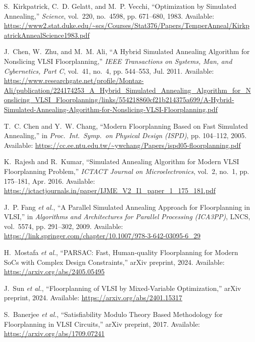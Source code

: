 \documentclass[9pt,a4paper,twoside]{rho-class/rho}
\begin{document}
\begin{thebibliography}{99}

S.~Kirkpatrick, C.~D. Gelatt, and M.~P. Vecchi,
``Optimization by Simulated Annealing,''
\textit{Science}, vol.~220, no.~4598, pp. 671–680, 1983.
Available: \url{https://www2.stat.duke.edu/~scs/Courses/Stat376/Papers/TemperAnneal/KirkpatrickAnnealScience1983.pdf}

J.~Chen, W.~Zhu, and M.~M. Ali,
``A Hybrid Simulated Annealing Algorithm for Nonslicing VLSI Floorplanning,''
\textit{IEEE Transactions on Systems, Man, and Cybernetics, Part C}, vol.~41, no.~4, pp. 544–553, Jul. 2011.
Available: \url{https://www.researchgate.net/profile/Montaz-Ali/publication/224174253_A_Hybrid_Simulated_Annealing_Algorithm_for_Nonslicing_VLSI_Floorplanning/links/554218860cf21b214375a699/A-Hybrid-Simulated-Annealing-Algorithm-for-Nonslicing-VLSI-Floorplanning.pdf}

T.~C. Chen and Y.~W. Chang,
``Modern Floorplanning Based on Fast Simulated Annealing,''
in \textit{Proc.\ Int.\ Symp.\ on Physical Design (ISPD)}, pp. 104–112, 2005.
Available: \url{https://cc.ee.ntu.edu.tw/~ywchang/Papers/ispd05-floorplanning.pdf}

K.~Rajesh and R.~Kumar,
``Simulated Annealing Algorithm for Modern VLSI Floorplanning Problem,''
\textit{ICTACT Journal on Microelectronics}, vol.~2, no.~1, pp. 175–181, Apr. 2016.
Available: \url{https://ictactjournals.in/paper/IJME_V2_I1_paper_1_175_181.pdf}

J.~P. Fang \emph{et al.},
``A Parallel Simulated Annealing Approach for Floorplanning in VLSI,''
in \textit{Algorithms and Architectures for Parallel Processing (ICA3PP)}, LNCS, vol.~5574, pp. 291–302, 2009.
Available: \url{https://link.springer.com/chapter/10.1007/978-3-642-03095-6_29}

H.~Mostafa \emph{et al.},
``PARSAC: Fast, Human-quality Floorplanning for Modern SoCs with Complex Design Constraints,''
arXiv preprint, 2024.
Available: \url{https://arxiv.org/abs/2405.05495}

J.~Sun \emph{et al.},
``Floorplanning of VLSI by Mixed-Variable Optimization,''
arXiv preprint, 2024.
Available: \url{https://arxiv.org/abs/2401.15317}

S.~Banerjee \emph{et al.},
``Satisfiability Modulo Theory Based Methodology for Floorplanning in VLSI Circuits,''
arXiv preprint, 2017.
Available: \url{https://arxiv.org/abs/1709.07241}

\end{thebibliography}



\end{document}
